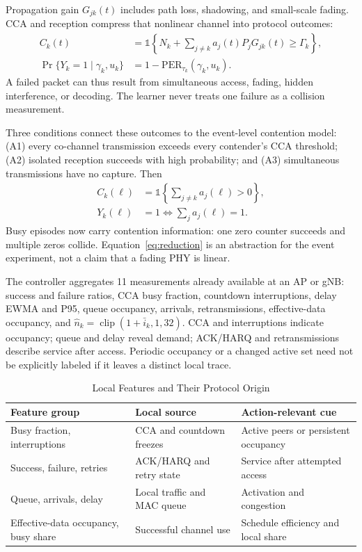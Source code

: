 Propagation gain $G_{jk}(t)$ includes path loss, shadowing, and small-scale
fading. CCA and reception compress that nonlinear channel into protocol
outcomes:
\begin{align}
C_k(t)&=\mathbb 1\!\left\{N_k+\sum_{j\ne k}a_j(t)P_jG_{jk}(t)
\geq\Gamma_k\right\},
\label{eq:cca}\\
\Pr\{Y_k=1\mid\gamma_k,u_k\}
&=1-\mathrm{PER}_{\tau_k}(\gamma_k,u_k).
\label{eq:success}
\end{align}
A failed packet can thus result from simultaneous access, fading, hidden
interference, or decoding. The learner never treats one failure as a collision
measurement.

Three conditions connect these outcomes to the event-level contention model:
(A1) every co-channel transmission exceeds every contender's CCA threshold;
(A2) isolated reception succeeds with high probability; and (A3) simultaneous
transmissions have no capture. Then
\begin{equation}
\begin{aligned}
C_k(\ell)&=\mathbb 1\!\left\{\sum_{j\ne k}a_j(\ell)>0\right\},\\
Y_k(\ell)&=1\iff\sum_j a_j(\ell)=1.
\end{aligned}
\label{eq:reduction}
\end{equation}
Busy episodes now carry contention information: one zero counter succeeds and
multiple zeros collide. Equation~\eqref{eq:reduction} is an abstraction for
the event experiment, not a claim that a fading PHY is linear.

The controller aggregates 11 measurements already available at an AP or gNB:
success and failure ratios, CCA busy fraction, countdown interruptions, delay
EWMA and P95, queue occupancy, arrivals, retransmissions, effective-data
occupancy, and $\hat n_k=\operatorname{clip}(1+\bar i_k,1,32)$. CCA and
interruptions indicate occupancy; queue and delay reveal demand; ACK/HARQ and
retransmissions describe service after access. Periodic occupancy or a changed
active set need not be explicitly labeled if it leaves a distinct local trace.

\begin{table}[!t]
\caption{Local Features and Their Protocol Origin}
\label{tab:context}
\centering
\scriptsize
\begin{tabularx}{\columnwidth}{@{}p{19mm}p{24mm}Y@{}}
\toprule
Feature group & Local source & Action-relevant cue \\
\midrule
Busy fraction, interruptions & CCA and countdown freezes & Active peers or persistent occupancy \\
Success, failure, retries & ACK/HARQ and retry state & Service after attempted access \\
Queue, arrivals, delay & Local traffic and MAC queue & Activation and congestion \\
Effective-data occupancy, busy share & Successful channel use & Schedule efficiency and local share \\
\bottomrule
\end{tabularx}
\end{table}

